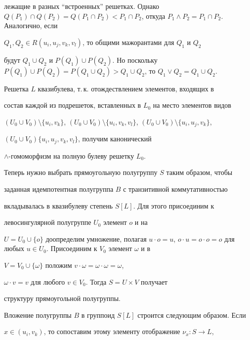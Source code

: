 \begin{pf}
лежащие в разных ``встроенных'' решетках. Однако $Q(P_1)\cap Q(P_2)=Q(P_1\cap


P_2)< P_1\cap P_2$, откуда $P_1\wedge P_2=P_1\cap P_2$. Аналогично, если


$Q_1,Q_2\in R(u_i,u_j,v_k,v_l)$, то общими мажорантами для $Q_1$ и $Q_2$


будут $Q_1\cup Q_2$ и $P(Q_1)\cup P(Q_2)$. Но поскольку $P(Q_1)\cup


P(Q_2)=P(Q_1\cup Q_2)>Q_1\cup Q_2$, то $Q_1\vee Q_2=Q_1\cup Q_2$.





Решетка $L$ квазибулева, т.\,к. отождествлением элементов,  входящих в


состав каждой из подрешеток, вставленных в $L_0$ на место элементов видов


$(U_0\cup V_0)\setminus\{u_i,v_k\}$, $(U_0\cup


V_0)\setminus\{u_i,v_k,v_l\}$, $(U_0\cup V_0)\setminus\{u_i,u_j,v_k\}$,


$(U_0\cup V_0)\{u_i,u_j,v_k,v_l\}$, получим канонический


$\wedge$-гомоморфизм на полную булеву решетку $L_0$.





Теперь нужно выбрать прямоугольную полугруппу $S$ таким образом, чтобы


заданная идемпотентная полугруппа $B$ с транзитивной коммутативностью


вкладывалась в квазибулеву степень $S[L]$. Для этого присоединим к


левосингулярной полугруппе $U_0$ элемент $o$ и на


$U=U_0\cup\{o\}$ доопределим умножение, полагая $u\cdot o=u$, $o\cdot


u=o\cdot o=o$ для любых $u\in U_0$. Присоединим к $V_0$ элемент $\omega$ и в


$V=V_0\cup\{\omega\}$ положим $v\cdot\omega=\omega\cdot\omega=\omega$,


$\omega\cdot v=v$ для любого $v\in V_0$. Тогда $S=U\times V$ получает


структуру прямоугольной полугруппы.





Вложение полугруппы $B$ в группоид $S[L]$ строится следующим образом. Если


$x\in(u_i,v_k)$, то сопоставим этому элементу отображение $\nu_x: S\to L$,



\end{pf}
